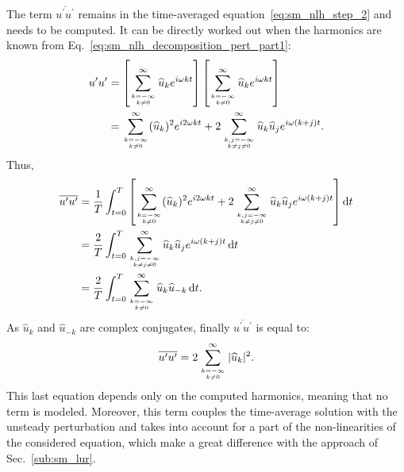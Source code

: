 The term $\overline{u^\prime u^\prime}$ remains in the time-averaged
equation~\eqref{eq:sm_nlh_step_2}
and needs to be computed. It can be 
directly worked out when the harmonics are known 
from Eq.~\eqref{eq:sm_nlh_decomposition_pert_part1}:
\begin{equation}
	\begin{split}
		u^\prime u^\prime &= 
		\left[
			\sum_{\genfrac{}{}{0pt}{}{k=-\infty}{k \neq 0}}^{\infty} \widehat{u}_k e^{i \omega k t} 
		\right]
		\left[
			\sum_{\genfrac{}{}{0pt}{}{k=-\infty}{k \neq 0}}^{\infty} \widehat{u}_k e^{i \omega k t} 
		\right] \\
		&= \sum_{\genfrac{}{}{0pt}{}{k=-\infty}{k \neq 0}}^{\infty} (\widehat{u}_k)^2
		   e^{i 2 \omega k t} +
		   2 \sum_{\genfrac{}{}{0pt}{}{k,j=-\infty}{k \neq j \neq 0}}^{\infty} 
		   \widehat{u}_k \widehat{u}_j e^{i \omega (k + j) t}.
	\end{split}
\end{equation}
Thus,
\begin{equation}
	\begin{split}
		\overline{u^\prime u^\prime} &= 
		\frac{1}{T} \int_{t=0}^{T} \left[ 
			\sum_{\genfrac{}{}{0pt}{}{k=-\infty}{k \neq 0}}^{\infty} (\widehat{u}_k)^2
		   	e^{i 2 \omega k t} +
		   	2 \sum_{\genfrac{}{}{0pt}{}{k,j=-\infty}{k \neq j \neq 0}}^{\infty} 
		   	\widehat{u}_k \widehat{u}_j e^{i \omega (k + j) t} 
		\right] \diff t\\
		&= \frac{2}{T} \int_{t=0}^{T} \sum_{\genfrac{}{}{0pt}{}{k,j=-\infty}{k \neq j \neq 0}}^{\infty} 
		   	\widehat{u}_k \widehat{u}_j 
		   	e^{i \omega (k + j) t} \diff t \\
		&= \frac{2}{T} \int_{t=0}^{T} 
			\sum_{\genfrac{}{}{0pt}{}{k=-\infty}{k \neq 0}}^{\infty} 
			\widehat{u}_k \widehat{u}_{-k}  \diff t.
	\end{split}
\end{equation}
As $\widehat{u}_k$ and $\widehat{u}_{-k}$ are complex conjugates,
finally $\overline{u^\prime u^\prime}$ is equal to:
\begin{equation}
	\overline{u^\prime u^\prime} = 
	2 \sum_{\genfrac{}{}{0pt}{}{k=-\infty}{k \neq 0}}^{\infty} |\widehat{u}_k|^2.
	\label{eq:sm_nlh_deterministic_stress_terms}
\end{equation}
This last equation depends only on the computed harmonics, meaning
that no term is modeled. Moreover, this term couples the
time-average solution with the unsteady perturbation
and takes into account for a part of the 
non-linearities of the considered equation, which make a
great difference with the approach of Sec.~\ref{sub:sm_lur}.

